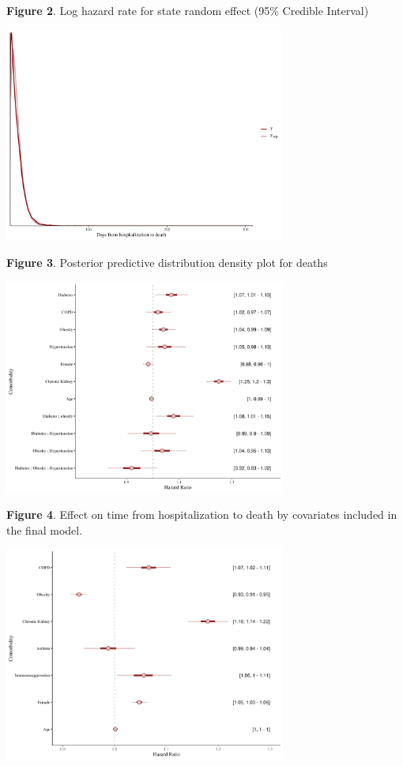 \documentclass[10pt,letterpaper]{article}
\begin{document}
\textbf{Figure 2}. Log hazard rate for state random effect (95\%
Credible Interval)

\begin{center}\includegraphics[width=350px]{../CC2/jer2modi/ppc_plot_modi_mort} \end{center}

\textbf{Figure 3}. Posterior predictive distribution density plot for
deaths

\begin{center}\includegraphics[width=350px]{../CC2/jer2modi/beta_intervalsjer2modi} \end{center}

\textbf{Figure 4}. Effect on time from hospitalization to death by
covariates included in the final model.

\begin{center}\includegraphics[width=350px]{../CC2/jer2modi/beta_h_intervalsjer2modi} \end{center}
\end{document}
